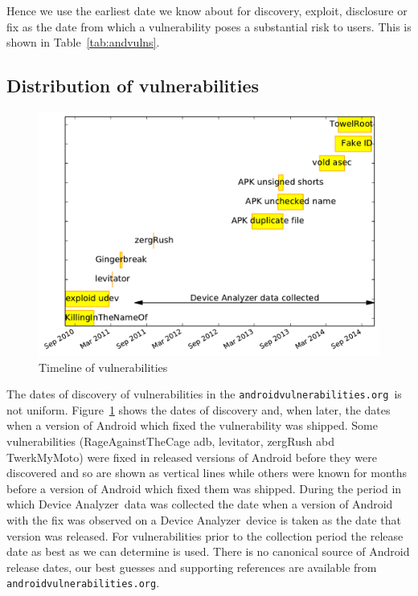 \documentclass[conference,a4paper,twoside]{IEEEtran}
\newcommand{\da}{Device Analyzer}
\newcommand{\avo}{\texttt{androidvulnerabilities.org}}
\begin{document}
Hence we use the earliest date we know about for discovery, exploit, disclosure or fix as the date from which a vulnerability poses a substantial risk to users.
This is shown in Table~\ref{tab:andvulns}.


\subsection{Distribution of vulnerabilities}
\begin{figure}
 \centering
 \includegraphics[width=\columnwidth]{figures/vulnerabilities_timeline}
 \caption{Timeline of vulnerabilities}
 \label{fig:vulnerabilities_timeline}
\end{figure}

The dates of discovery of vulnerabilities in the \avo\ is not uniform.
Figure~\ref{fig:vulnerabilities_timeline} shows the dates of discovery and, when later, the dates when a version of Android which fixed the vulnerability was shipped.
Some vulnerabilities (RageAgainstTheCage adb, levitator, zergRush abd TwerkMyMoto) were fixed in released versions of Android before they were discovered and so are shown as vertical lines while others were known for months before a version of Android which fixed them was shipped.
During the period in which \da\ data was collected the date when a version of Android with the fix was observed on a \da\ device is taken as the date that version was released.
For vulnerabilities prior to the collection period the release date as best as we can determine is used.
There is no canonical source of Android release dates, our best guesses and supporting references are available from \avo.
\end{document}
